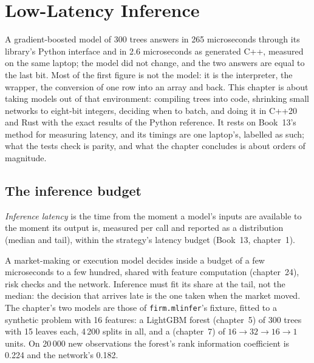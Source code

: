 \chapter{Low-Latency Inference}\label{ch:ml:low-latency-inference}

A gradient-boosted model of 300 trees answers in 265 microseconds through its library's Python interface and in 2.6
microseconds as generated C++, measured on the same laptop; the model did not change, and the two answers are equal to the
last bit. Most of the first figure is not the model: it is the interpreter, the wrapper, the conversion of one row into an
array and back. This chapter is about taking models out of that environment: compiling trees into code, shrinking small
networks to eight-bit integers, deciding when to batch, and doing it in C++20 and Rust with the exact results of the Python
reference. It rests on Book~13's method for measuring latency, and its timings are one laptop's, labelled as such; what the
tests check is parity, and what the chapter concludes is about orders of magnitude.

\section{The inference budget}

\begin{definition}\label{def:ml:low-latency-inference:latency}
\emph{Inference latency} is the time from the moment a model's inputs are available to the moment
its output is, measured per call and reported as a distribution (median and tail), within the strategy's latency budget
(Book~13, chapter~1).
\end{definition}

A market-making or execution model decides inside a budget of a few microseconds to a few hundred, shared with feature
computation (chapter~24), risk checks and the network. Inference must fit its share at the tail, not the median: the decision
that arrives late is the one taken when the market moved. The chapter's two models are those of \texttt{firm.mlinfer}'s
fixture, fitted to a synthetic problem with 16 features: a LightGBM forest (chapter~5) of 300 trees with 15 leaves each, 4\,200
splits in all, and a  (chapter~7) of $16\to32\to16\to1$ units. On 20\,000 new observations the forest's
rank information coefficient is 0.224 and the network's 0.182.

